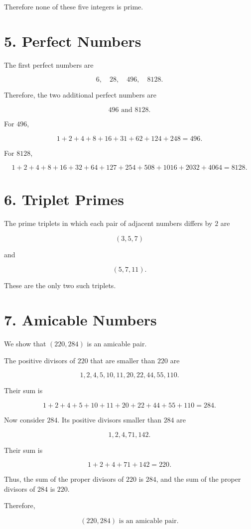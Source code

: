 \documentclass[12pt]{article}
\begin{document}
Therefore none of these five integers is prime.

\section*{5. Perfect Numbers}

The first perfect numbers are

\[
6,\quad28,\quad496,\quad8128.
\]

Therefore, the two additional perfect numbers are

\[
\boxed{496\text{ and }8128}.
\]

For $496$,

\[
1+2+4+8+16+31+62+124+248=496.
\]

For $8128$,

\[
1+2+4+8+16+32+64+127+254
+508+1016+2032+4064=8128.
\]

\section*{6. Triplet Primes}

The prime triplets in which each pair of adjacent numbers differs by $2$ are

\[
\boxed{(3,5,7)}
\]

and

\[
\boxed{(5,7,11)}.
\]

These are the only two such triplets.

\section*{7. Amicable Numbers}

We show that $(220,284)$ is an amicable pair.

The positive divisors of $220$ that are smaller than $220$ are

\[
1,2,4,5,10,11,20,22,44,55,110.
\]

Their sum is

\[
1+2+4+5+10+11+20+22+44+55+110
=284.
\]

Now consider $284$. Its positive divisors smaller than $284$ are

\[
1,2,4,71,142.
\]

Their sum is

\[
1+2+4+71+142=220.
\]

Thus, the sum of the proper divisors of $220$ is $284$, and the sum of the proper divisors of $284$ is $220$.

Therefore,

\[
\boxed{(220,284)\text{ is an amicable pair}.}
\]
\end{document}
